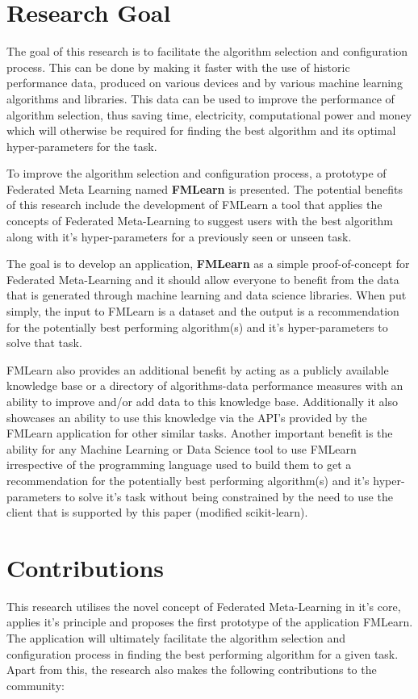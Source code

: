 \section{Research Goal}
The goal of this research is to facilitate the algorithm selection and configuration process. This can be done by making it faster with the use of historic performance data, produced on various devices and by various machine learning algorithms and libraries. This data can be used to improve the performance of algorithm selection, thus saving time, electricity, computational power and money which will otherwise be required for finding the best algorithm and its optimal hyper-parameters for the task.

To improve the algorithm selection and configuration process, a prototype of Federated Meta Learning named \textbf{FMLearn} is presented. The potential benefits of this research include the development of FMLearn a tool that applies the concepts of Federated Meta-Learning to suggest users with the best algorithm along with it's hyper-parameters for a previously seen or unseen task.

The goal is to develop an application, \textbf{FMLearn} as a simple proof-of-concept for Federated Meta-Learning and it should allow everyone to benefit from the data that is generated through machine learning and data science libraries. When put simply, the input to FMLearn is a dataset and the output is a recommendation for the potentially best performing algorithm(s) and it's hyper-parameters to solve that task.

FMLearn also provides an additional benefit by acting as a publicly available knowledge base or a directory of algorithms-data performance measures with an ability to improve and/or add data to this knowledge base. Additionally it also showcases an ability to use this knowledge via the API's provided by the FMLearn application for other similar tasks. Another important benefit is the ability for any Machine Learning or Data Science tool to use FMLearn irrespective of the programming language used to build them to get a recommendation for the potentially best performing algorithm(s) and it's hyper-parameters to solve it's task without being constrained by the need to use the client that is supported by this paper (modified scikit-learn).


\section{Contributions}
This research utilises the novel concept of Federated Meta-Learning in it's core, applies it's principle and proposes the first prototype of the application FMLearn. The application will ultimately facilitate the algorithm selection and configuration process in finding the best performing algorithm for a given task. Apart from this, the research also makes the following contributions to the community:

